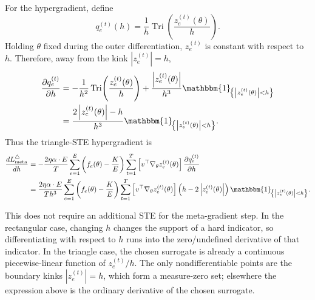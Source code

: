 \documentclass[11pt]{article}
\newcommand{\indic}[1]{\mathbbm{1}_{\!\left\{#1\right\}}}
\newcommand{\totalexperts}{E}
\newcommand{\activeexperts}{K}
\newcommand{\batchsize}{T}
\newcommand{\assignmentfraction}{f}
\newcommand{\modelparams}{\theta}
\newcommand{\lbcoef}{\alpha}
\newcommand{\bandwidth}{h}
\newcommand{\tri}{\operatorname{Tri}}
\newcommand{\abs}[1]{\left\vert#1\right\vert}
\begin{document}
For the hypergradient, define
\[
  q_e^{(t)}(\bandwidth)
  =
  \frac{1}{\bandwidth}
  \tri\!\left(
    \frac{z_e^{(t)}(\modelparams)}{\bandwidth}
  \right).
\]
Holding $\modelparams$ fixed during the outer differentiation, $z_e^{(t)}$ is
constant with respect to $\bandwidth$.  Therefore, away from the kink
$\abs{z_e^{(t)}}=\bandwidth$,
\[
\begin{aligned}
  \frac{\partial q_e^{(t)}}{\partial\bandwidth}
  &=
  -\frac{1}{\bandwidth^2}
  \tri\!\left(
    \frac{z_e^{(t)}(\modelparams)}{\bandwidth}
  \right)
  +
  \frac{\abs{z_e^{(t)}(\modelparams)}}{\bandwidth^3}
  \indic{\abs{z_e^{(t)}(\modelparams)}<\bandwidth} \\
  &=
  \frac{2\abs{z_e^{(t)}(\modelparams)}-\bandwidth}{\bandwidth^3}
  \indic{\abs{z_e^{(t)}(\modelparams)}<\bandwidth}.
\end{aligned}
\]
Thus the triangle-STE hypergradient is
\[
\begin{aligned}
  \frac{dL_{\mathrm{meta}}^{\triangle}}{d\bandwidth}
  &=
  -\frac{2\eta\lbcoef \cdot \totalexperts}{\batchsize}
  \sum_{e=1}^{\totalexperts}
  \left(
    \assignmentfraction_e(\modelparams)
    -
    \frac{\activeexperts}{\totalexperts}
  \right)
  \sum_{t=1}^{\batchsize}
  \left[
    v^\top
    \nabla_{\modelparams}z_e^{(t)}(\modelparams)
  \right]
  \frac{\partial q_e^{(t)}}{\partial\bandwidth} \\
  &=
  \frac{2\eta\lbcoef \cdot \totalexperts}
       {\batchsize\bandwidth^3}
  \sum_{e=1}^{\totalexperts}
  \left(
    \assignmentfraction_e(\modelparams)
    -
    \frac{\activeexperts}{\totalexperts}
  \right)
  \sum_{t=1}^{\batchsize}
  \left[
    v^\top
    \nabla_{\modelparams}z_e^{(t)}(\modelparams)
  \right]
  \left(
    \bandwidth - 2\abs{z_e^{(t)}(\modelparams)}
  \right)
  \indic{\abs{z_e^{(t)}(\modelparams)}<\bandwidth}.
\end{aligned}
\]

This does not require an additional STE for the meta-gradient step.  In the
rectangular case, changing $\bandwidth$ changes the support of a hard
indicator, so differentiating with respect to $\bandwidth$ runs into the
zero/undefined derivative of that indicator.  In the triangle case, the
chosen surrogate is already a continuous piecewise-linear function of
$z_e^{(t)}/\bandwidth$.  The only nondifferentiable points are the boundary
kinks $\abs{z_e^{(t)}}=\bandwidth$, which form a measure-zero set; elsewhere
the expression above is the ordinary derivative of the chosen surrogate.
\end{document}
